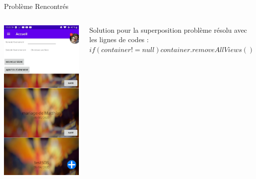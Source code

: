 \documentclass[11pt]{beamer}
\begin{document}
\begin{frame}{Problème Rencontrés}
\begin{columns}
\includegraphics[scale=0.2]{SupperPosFrag}

\begin{mybox}{Solution pour la superposition}
problème résolu avec les lignes de codes :$if(container != null){
container.removeAllViews()}$ 
\end{mybox}


\end{columns}
\end{frame}
\end{document}
